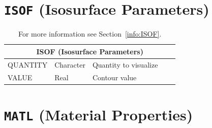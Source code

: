 \documentclass[11pt]{book}
\begin{document}
\vspace{\baselineskip}


\section{\texorpdfstring{{\tt ISOF}}{ISOF} (Isosurface Parameters)}

\hspace{1in}

\begin{table}[H]
\caption{For more information see Section~\ref{info:ISOF}.}\label{tbl:ISOF}
\noindent
\begin{tabular*}{\textwidth}{@{\extracolsep{\fill}}|l|l|l|l|l|}
\hline
\multicolumn{5}{|c|}{{\ct ISOF} (Isosurface Parameters)} \\ \hline \hline
{\ct QUANTITY}      & Character & Quantity to visualize &       &     \\ \hline
{\ct VALUE}         & Real      & Contour value         &       &     \\ \hline
\end{tabular*}
\end{table}

\vspace{\baselineskip}

\vfill

\section{\texorpdfstring{{\tt MATL}}{MATL} (Material Properties)}

\hspace{1in}
\end{document}
